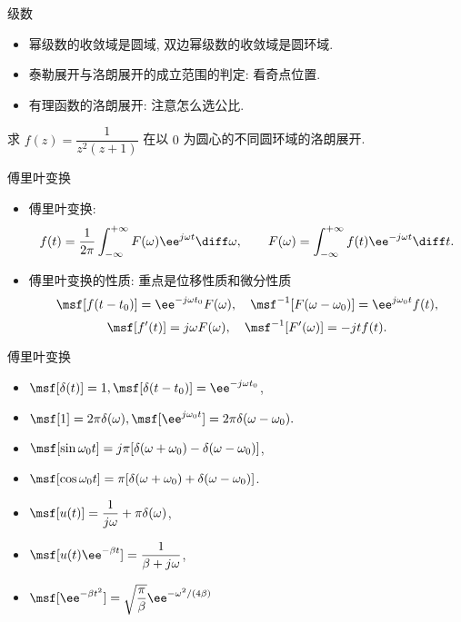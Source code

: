 \documentclass[aspectratio=169,handout]{ctexbeamer}
\begin{document}
\begin{frame}{级数}
	\begin{itemize}
		\item 幂级数的收敛域是圆域, 双边幂级数的收敛域是圆环域.
		\item 泰勒展开与洛朗展开的成立范围的判定: 看奇点位置.
		\item 有理函数的洛朗展开: 注意怎么选公比.
	\end{itemize}
	\onslide<+->
	\begin{exercise}
		求 $f(z)=\dfrac{1}{z^2(z+1)}$ 在以 $0$ 为圆心的不同圆环域的洛朗展开.
	\end{exercise}
\end{frame}


\begin{frame}{傅里叶变换}
	\begin{itemize}
		\item 傅里叶变换:
	\[
			f(t)=\frac1{2\pi} \int_{-\infty}^{+\infty}F(\omega) \ee^{j\omega t} \diff\omega,\qquad
			F(\omega)=\int_{-\infty}^{+\infty}f(t) \ee^{-j\omega t} \diff t.
	\]
		\item 傅里叶变换的性质: 重点是位移性质和微分性质
	\[
			\msf[f(t-t_0)]=\ee^{-j\omega t_0}F(\omega),\quad
			\msf^{-1}[F(\omega-\omega_0)]=\ee^{j\omega_0 t}f(t),
	\]
	\[
			\msf[f'(t)]=j\omega F(\omega),\quad
			\msf^{-1}[F'(\omega)]=-jtf(t).
	\]
	\end{itemize}
\end{frame}


\begin{frame}{傅里叶变换}
	\begin{itemize}
		\item $\msf[\delta(t)]=1,\msf[\delta(t-t_0)]=\ee^{-j\omega t_0}$,
		\item $\msf[1]=2\pi \delta(\omega),\msf[\ee^{j\omega_0 t}]=2\pi\delta(\omega-\omega_0).$
		\item $\msf[\sin{\omega_0 t}]=j\pi[\delta(\omega+\omega_0)-\delta(\omega-\omega_0)]$,
		\item $\msf[\cos{\omega_0 t}]=\pi[\delta(\omega+\omega_0)+\delta(\omega-\omega_0)]$.
		\item $\msf[u(t)]=\dfrac1{j\omega}+\pi\delta(\omega)$,
		\item $\msf[u(t)\ee^{-\beta t}]=\dfrac1{\beta+j\omega}$,
		\item $\msf[\ee^{-\beta t^2}]=\sqrt{\dfrac\pi\beta}\ee^{-\omega^2/(4\beta)}$
	\end{itemize}
\end{frame}
\end{document}
